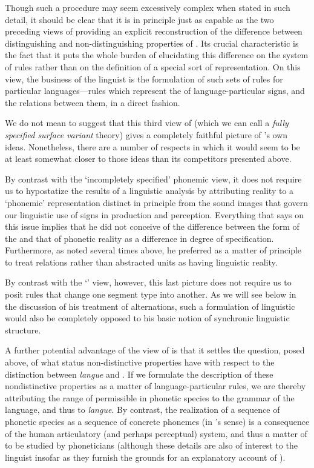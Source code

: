 Though such a procedure may seem excessively complex when stated in
such detail, it should be clear that it is in principle just as
capable as the two preceding views of providing an explicit
reconstruction of the difference between distinguishing and
non-distin\-guish\-ing properties of \emph{}. Its crucial
characteristic is the fact that it puts the whole burden of
elucidating this difference on the system of {rules} rather than on the
definition of a special sort of representation. On this view, the
business of the linguist is the formulation of such sets of {rules} for
particular languages—{rules} which represent the \emph{} of
language-particular signs, and the relations between them, in a direct
fashion.

We do not mean to suggest that this third view of 
(which we can call a \emph{fully specified surface variant} theory) gives a
completely faithful picture of {\Saussure}'s own ideas. Nonetheless,
there are a number of respects in which it would seem to be at least
somewhat closer to those ideas than its competitors presented above.

By {contrast} with the `incompletely specified' phonemic view, it does
not require us to hypostatize the results of a linguistic analysis by
attributing reality to a `phonemic' representation distinct in
principle from the sound images that govern our linguistic use of
signs in production and perception. Everything that {\Saussure} says on
this issue implies that he did not conceive of the difference between
the form of the \emph{} and that of phonetic reality as a
difference in degree of specification. Furthermore, as noted several
times above, he preferred as a matter of principle to treat relations
rather than abstracted units as having linguistic reality.

By {contrast} with the `' view, however,
this last picture does not require us to posit {rules} that {change} one
segment type into another. As we will see below in the discussion of
his treatment of alternations, such a formulation of linguistic
 would also be completely opposed to his basic notion of
synchronic linguistic structure.

A further potential advantage of the 
view of  is that it settles the question, posed above,
of what status non-distinctive properties have with respect to the
distinction between \emph{langue} and \emph{}. If we formulate
the description of these nondistinctive properties as a matter of
language-particular {rules}, we are thereby attributing the range of
permissible  in phonetic species to the grammar of the
language, and thus to \emph{langue}. By {contrast}, the realization of a
sequence of phonetic species as a sequence of concrete phonemes (in
{\Saussure}'s sense) is a consequence of the human articulatory (and
perhaps perceptual) system, and thus a matter of \emph{} to be
studied by phoneticians (although these details are also of interest
to the linguist insofar as they furnish the grounds for an explanatory
account of ).

